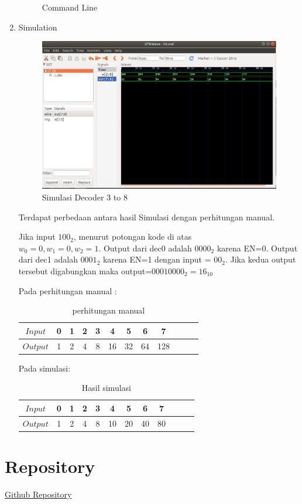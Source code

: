 \documentclass{class}
\begin{document}
\begin{enumerate}
\begin{figure}[H]
        \caption{Command Line}
        \label{decoder24}
        \end{figure}
    \item Simulation
    \begin{figure}[H]
        \centering
        \includegraphics[width=1\linewidth]{gambar/simulation38.png}
        \caption{Simulasi Decoder 3 to 8}
        \label{decoder24}
        \end{figure}
    Terdapat perbedaan antara hasil Simulasi dengan perhitungan manual. 
    
    Jika input $100_2$, menurut potongan kode di atas \\
    $w_0 = 0, w_1 = 0, w_2 = 1$.
    Output dari dec0 adalah $0000_2$ karena EN=0.
    Output dari dec1 adalah $0001_2$ karena EN=1 dengan input = $00_2$.
    Jika kedua output tersebut digabungkan maka output=$00010000_2=16_{10}$

    Pada perhitungan manual :\\
    \begin{table}[H]
        \begin{tabular}{|c|c|c|c|c|c|c|c|c|c|c|c}
            \hline
            $Input$  & 0 & 1 & 2 & 3 & 4 & 5 & 6 & 7 \\ \hline
            $Output$ & 1 & 2 & 4 & 8 & 16 & 32 & 64 & 128\\ \hline
        \end{tabular}
        \caption{perhitungan manual}
    \end{table}
    Pada simulasi:
    \begin{table}[H]
        \begin{tabular}{|c|c|c|c|c|c|c|c|c|c|c|c}
            \hline
            $Input$  & 0 & 1 & 2 & 3 & 4 & 5 & 6 & 7 \\ \hline
            $Output$ & 1 & 2 & 4 & 8 & 10 & 20 & 40 & 80\\ \hline
        \end{tabular}
        \caption{Hasil simulasi}
    \end{table}
\end{enumerate}
\section{Repository}
\href{https://github.com/afrizaloky/PSD}{Github Repository}
\end{document}
